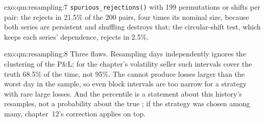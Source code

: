 \begin{solution}{exo:qm:resampling:7}
\texttt{spurious\_rejections()} with 199 permutations or shifts per pair: the  rejects in 21.5\% of the 200 pairs, four
times its nominal size, because both series are persistent and shuffling destroys that; the circular-shift test, which keeps each series'
dependence, rejects in 2.5\%.
\end{solution}

\begin{solution}{exo:qm:resampling:8}
Three flaws. Resampling days independently ignores the clustering of the P\&L; for the chapter's volatility seller such intervals cover
the truth 68.5\% of the time, not 95\%. The  cannot produce losses larger than the worst day in the sample, so even block
intervals are too narrow for a strategy with rare large losses. And the percentile is a statement about this history's resamples, not a
probability about the true ; if the strategy was chosen among many, chapter~12's correction applies on top.
\end{solution}

